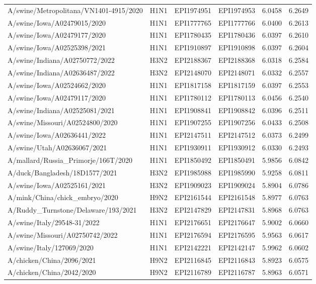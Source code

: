 \begin{tabular}{L{1.95in}|L{.25in}|L{.60in}|L{.6in}|C{1in}|C{1in}}
 A/swine/Metropolitana/VN1401-4915/2020 &H1N1&EPI1974951&EPI1974953&6.0458&6.2649\\
 A/swine/Iowa/A02479015/2020 &H1N1&EPI1777765&EPI1777766&6.0400&6.2613\\
 A/swine/Iowa/A02479177/2020 &H1N1&EPI1780435&EPI1780436&6.0397&6.2610\\
 A/swine/Iowa/A02525398/2021 &H1N1&EPI1910897&EPI1910898&6.0397&6.2604\\
 A/swine/Indiana/A02750772/2022 &H3N2&EPI2188367&EPI2188368&6.0318&6.2584\\
 A/swine/Indiana/A02636487/2022 &H3N2&EPI2148070&EPI2148071&6.0332&6.2557\\
 A/swine/Iowa/A02524662/2020 &H1N1&EPI1817158&EPI1817159&6.0397&6.2553\\
 A/swine/Iowa/A02479117/2020 &H1N1&EPI1780112&EPI1780113&6.0456&6.2540\\
 A/swine/Indiana/A02525081/2021 &H1N1&EPI1908841&EPI1908842&6.0396&6.2511\\
 A/swine/Missouri/A02524800/2020 &H1N1&EPI1907255&EPI1907256&6.0433&6.2508\\
 A/swine/Iowa/A02636441/2022 &H1N1&EPI2147511&EPI2147512&6.0373&6.2499\\
 A/swine/Utah/A02636067/2021 &H1N1&EPI1930911&EPI1930912&6.0330&6.2493\\
 A/mallard/Russia\_Primorje/166T/2020 &H1N1&EPI1850492&EPI1850491&5.9856&6.0842\\
 A/duck/Bangladesh/18D1577/2021 &H3N2&EPI1985988&EPI1985990&5.9258&6.0811\\
 A/swine/Iowa/A02525161/2021 &H3N2&EPI1909023&EPI1909024&5.8904&6.0786\\
 A/mink/China/chick\_embryo/2020 &H9N2&EPI2161544&EPI2161548&5.8977&6.0763\\
 A/Ruddy\_Turnstone/Delaware/193/2021 &H3N2&EPI2147829&EPI2147831&5.8968&6.0763\\
 A/swine/Italy/29548-31/2022 &H1N1&EPI2176651&EPI2176647&5.9002&6.0660\\
 A/swine/Missouri/A02750742/2022 &H1N1&EPI2176594&EPI2176595&5.9563&6.0617\\
 A/swine/Italy/127069/2020 &H1N1&EPI2142221&EPI2142147&5.9962&6.0602\\
 A/chicken/China/2096/2021 &H9N2&EPI2116845&EPI2116843&5.8923&6.0575\\
 A/chicken/China/2042/2020 &H9N2&EPI2116789&EPI2116787&5.8963&6.0571\\
\hline\end{tabular}
